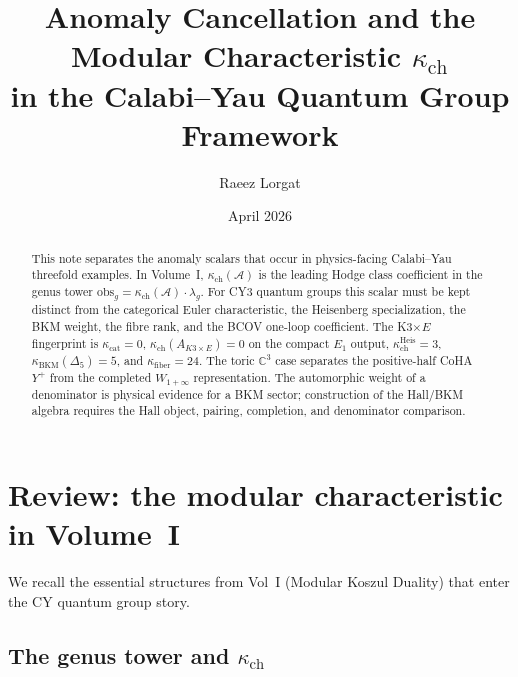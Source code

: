 \documentclass[11pt]{article}
\title{Anomaly Cancellation and the Modular Characteristic $\kappa_{\mathrm{ch}}$\\
in the Calabi--Yau Quantum Group Framework}
\author{Raeez Lorgat}
\date{April 2026}
\theoremstyle{definition}
\theoremstyle{remark}
\begin{document}
\maketitle

\begin{abstract}
This note separates the anomaly scalars that occur in physics-facing
Calabi--Yau threefold examples. In Volume~I,
$\kappa_{\mathrm{ch}}(\mathcal{A})$ is the leading Hodge class coefficient
in the genus tower
$\mathrm{obs}_g = \kappa_{\mathrm{ch}}(\mathcal{A}) \cdot \lambda_g$.
For CY3 quantum groups this scalar must be kept distinct from the
categorical Euler characteristic, the Heisenberg specialization, the BKM
weight, the fibre rank, and the BCOV one-loop coefficient. The K3$\times E$
fingerprint is
$\kappa_{\mathrm{cat}}=0$,
$\kappa_{\mathrm{ch}}(A_{K3\times E})=0$ on the compact $E_1$ output,
$\kappa_{\mathrm{ch}}^{\mathrm{Heis}}=3$,
$\kappa_{\mathrm{BKM}}(\Delta_5)=5$, and
$\kappa_{\mathrm{fiber}}=24$. The toric $\mathbb C^3$ case separates the
positive-half CoHA $Y^+$ from the completed $W_{1+\infty}$ representation.
The automorphic weight of a denominator is physical evidence for a BKM
sector; construction of the Hall/BKM algebra requires the Hall object,
pairing, completion, and denominator comparison.
\end{abstract}

\tableofcontents

\section{Review: the modular characteristic in Volume~I}
\label{sec:review}

We recall the essential structures from Vol~I (Modular Koszul Duality)
that enter the CY quantum group story.

\subsection{The genus tower and $\kappa_{\mathrm{ch}}$}
\end{document}

